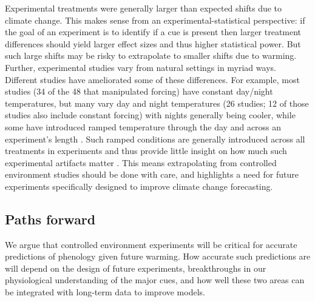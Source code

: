 \documentclass[11pt,letter]{article}
\begin{document}
Experimental treatments were generally larger than expected shifts due to climate change. This makes sense from an experimental-statistical perspective: if the goal of an experiment is to identify if a cue is present then larger treatment differences should yield larger effect sizes and thus higher statistical power. But such large shifts may be risky to extrapolate to smaller shifts due to warming. Further, experimental studies vary from natural settings in myriad ways. Different studies have ameliorated some of these differences. For example, most studies (34 of the 48 that manipulated forcing) have constant day/night temperatures, but many vary day and night temperatures (26 studies; 12 of those studies also include constant forcing) with nights generally being cooler, while some have introduced ramped temperature through the day and across an experiment's length \citep[e.g.,][]{Basler:2012,Laube:2014a}. Such ramped conditions are generally introduced across all treatments in experiments and thus provide little insight on how much such experimental artifacts matter \citep[but see][]{erwin1995}. This means extrapolating from controlled environment studies should be done with care, and highlights a need for future experiments specifically designed to improve climate change forecasting. 

\subsection{Paths forward} 
We argue that controlled environment experiments will be critical for accurate predictions of phenology given future warming. How accurate such predictions are will depend on the design of future experiments, breakthroughs in our physiological understanding of the major cues, and how well these two areas can be integrated with long-term data to improve models. \\
\end{document}
